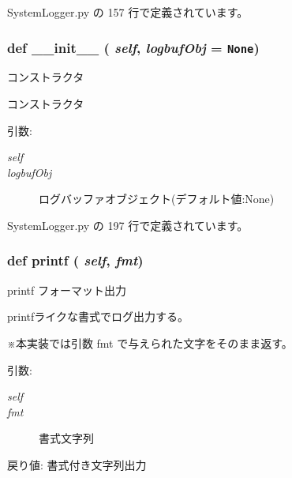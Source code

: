  SystemLogger.py の 157 行で定義されています。
\subsubsection{\setlength{\rightskip}{0pt plus 5cm}def \_\-\_\-init\_\-\_\- ( {\em self},  {\em logbufObj} = {\tt None})}\label{classsource__py_1_1_system_logger_1_1_log_stream_c775ee34451fdfa742b318538164070e}


コンストラクタ 

コンストラクタ

\begin{Desc}
\item[引数:]
\begin{description}
\item[{\em self}]\item[{\em logbufObj}]ログバッファオブジェクト(デフォルト値:None) \end{description}
\end{Desc}


 SystemLogger.py の 197 行で定義されています。
\subsubsection{\setlength{\rightskip}{0pt plus 5cm}def printf ( {\em self},  {\em fmt})}\label{classsource__py_1_1_system_logger_1_1_log_stream_e66db7801f82ae7e3eda9b6d53c06b1e}


printf フォーマット出力 

printfライクな書式でログ出力する。\par
 ※本実装では引数 fmt で与えられた文字をそのまま返す。

\begin{Desc}
\item[引数:]
\begin{description}
\item[{\em self}]\item[{\em fmt}]書式文字列\end{description}
\end{Desc}
\begin{Desc}
\item[戻り値:]書式付き文字列出力 \end{Desc}


